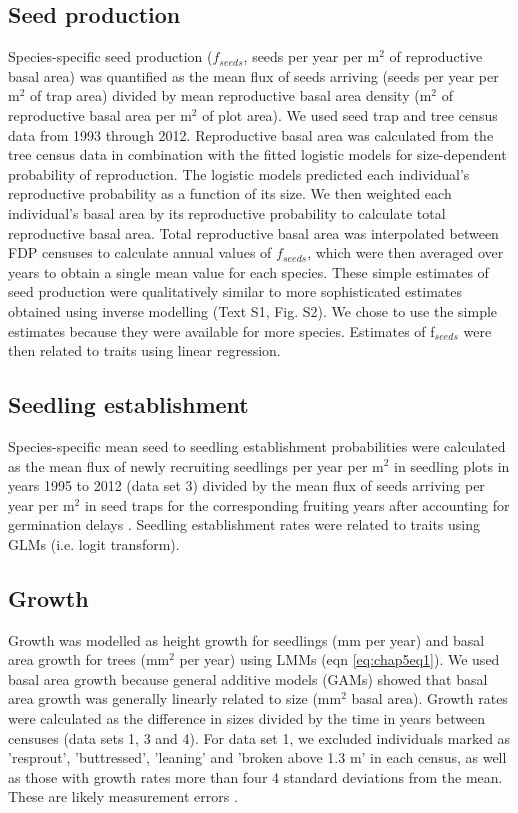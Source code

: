 \documentclass[b5paper,justified]{tufte-book} %
\begin{document}
\begin{fullwidth}
\subsection{Seed production}
Species-specific seed production ($f_{seeds}$, seeds per year per m$^2$ of reproductive basal area) was quantified as the mean flux of seeds arriving (seeds per year per m$^2$ of trap area) divided by mean reproductive basal area density (m$^2$ of reproductive basal area per m$^2$ of plot area). We used seed trap and tree census data from 1993 through 2012. Reproductive basal area was calculated from the tree census data in combination with the fitted logistic models for size-dependent probability of reproduction. The logistic models predicted each individual's reproductive probability as a function of its size. We then weighted each individual's basal area by its reproductive probability to calculate total reproductive basal area. Total reproductive basal area was interpolated between FDP censuses to calculate annual values of $f_{seeds}$, which were then averaged over years to obtain a single mean value for each species. These simple estimates of seed production were qualitatively similar to more sophisticated
estimates obtained using inverse modelling (Text S1, Fig. S2). We chose to use the simple estimates because they were available for more species. Estimates of f$_{seeds}$ were then related to traits using linear regression.

\subsection{Seedling establishment}
Species-specific mean seed to seedling establishment probabilities were calculated as the mean flux of newly recruiting seedlings per year per m$^2$ in seedling plots in years 1995 to 2012 (data set 3) divided by the mean flux of seeds arriving per year per m$^2$ in seed traps for the corresponding fruiting years after accounting for germination delays \citep[][data set 2]{Wright2005a}. Seedling establishment rates were related to traits using GLMs (i.e. logit transform). 

\subsection{Growth}
Growth was modelled as height growth for seedlings (mm per year) and basal area growth for trees (mm$^2$ per year) using LMMs (eqn \ref{eq:chap5eq1}). We used basal area growth because general additive models (GAMs) showed that basal area growth was generally linearly related to size (mm$^2$ basal area). Growth rates were calculated as the difference in sizes divided by the time in years between censuses (data sets 1, 3 and 4). For data set 1, we excluded individuals marked as 'resprout', 'buttressed', 'leaning' and 'broken above 1.3 m' in each census, as well as those with growth rates more than four 4 standard deviations from the mean. These are likely measurement errors \citep{Rueger2011}.


\end{fullwidth}
\end{document}
